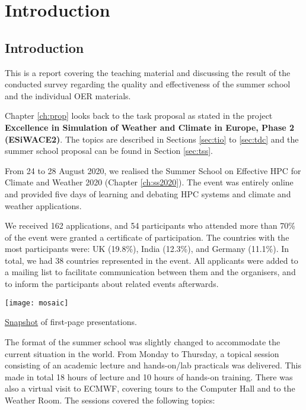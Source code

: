 \chapter{Introduction}
\label{ch:intro}

\section{Introduction}

This is a report covering the teaching material and discussing the result of the conducted survey regarding the quality and effectiveness of the summer school and the individual OER materials.

Chapter \ref{ch:prop} looks back to the task proposal as stated in the project \textbf{Excellence in Simulation of Weather and Climate in Europe, Phase 2 (ESiWACE2)}. The topics are described in Sections \ref{sec:tio} to \ref{sec:tdc} and the summer school proposal can be found in Section \ref{sec:tss}.

From 24 to 28 August 2020, we realised the Summer School on Effective HPC for Climate and Weather 2020 (Chapter \ref{ch:ss2020}). The event was entirely online and provided five days of learning and debating HPC systems and climate and weather applications.

We received 162 applications, and 54 participants who attended more than 70\% of the event were granted a certificate of participation. The countries with the most participants were: UK (19.8\%), India (12.3\%), and Germany (11.1\%). In total, we had 38 countries represented in the event. All applicants were added to a mailing list to facilitate communication between them and the organisers, and to inform the participants about related events afterwards.

\begin{table}[H]
\centering
\texttt{[image: mosaic]}
\caption{\href{https://www.photojoiner.net/v/BTvmSc6R}{Snapshot} of first-page presentations.}
\end{table}

The format of the summer school was slightly changed to accommodate the current situation in the world. From Monday to Thursday, a topical session consisting of an academic lecture and hands-on/lab practicals was delivered. This made in total 18 hours of lecture and 10 hours of hands-on training. There was also a virtual visit to ECMWF, covering tours to the Computer Hall and to the Weather Room. The sessions covered the following topics:

